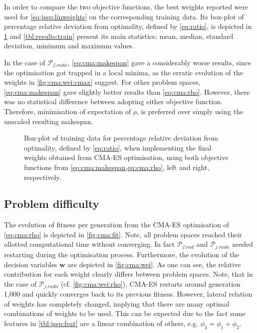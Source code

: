 \documentclass[graybox]{svmult}
\renewcommand{\vec}[1]{\mathbf{#1}}
\begin{document}
In order to compare the two objective functions, the best weights reported were 
used for \cref{eq:jssp:linweights} on the corresponding training data. Its 
box-plot of percentage relative deviation from optimality, defined by 
\cref{eq:ratio}, is depicted in \cref{fig:cma:trainboxpl} and 
\cref{tbl:results:train} present its main statistics; mean, median, standard 
deviation, minimum and maximum values.

In the case of $\mathcal{P}_{f.rndn}$, \cref{eq:cma:makespan}  gave a 
considerably worse results, since the optimisation got trapped in a local 
minima, as the erratic evolution of the weights in \cref{fig:cma:wei:cmax} 
suggest.
For other problem spaces, \cref{eq:cma:makespan} gave slightly better results 
than \cref{eq:cma:rho}. However, there was no statistical difference between 
adopting either objective function. Therefore, minimisation of expectation of 
$\rho$, is preferred over simply using the unscaled resulting makespan. 

\begin{figure}\centering
{}
\caption{Box-plot of training data for percentage relative deviation from 
optimality, defined by \cref{eq:ratio}, when implementing the final weights 
obtained from CMA-ES optimisation, using both objective functions from         
\cref{eq:cma:makespan,eq:cma:rho}, left and right, respectively.}
\label{fig:cma:trainboxpl}
\end{figure}

\subsection{Problem difficulty}\label{sec:expr:data}
The evolution of fitness per generation from the CMA-ES optimisation of 
\cref{eq:cma:rho} is depicted in \cref{fig:cma:fit}. Note, all problem spaces 
reached their allotted computational time without converging. In fact 
$\mathcal{P}_{f.rnd}$ and $\mathcal{P}_{j.rndn}$ needed restarting during the 
optimisation process. 
Furthermore, the  evolution of the decision variables $\vec{w}$ are depicted in 
\cref{fig:cma:wei}. As one can see, the relative contribution for each weight 
clearly differs between problem spaces. Note, that in the case of 
$\mathcal{P}_{j.rndn}$ (cf. \cref{fig:cma:wei:rho}), CMA-ES restarts around 
generation 1,000 and quickly converges back to its previous fitness. However, 
lateral relation of weights has completely changed, implying that there are 
many optimal combinations of weights to be used. This can be expected due  to 
the fact some features in \cref{tbl:jssp:feat} are a linear combination of 
others, e.g. $\phi_3=\phi_1+\phi_2$.
\end{document}
